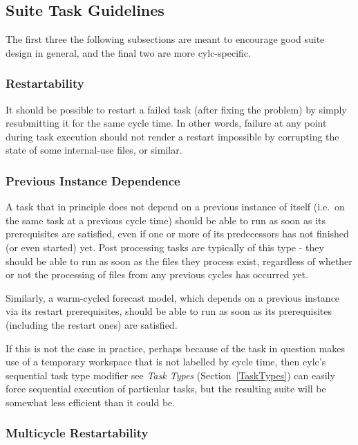 \documentclass[11pt,a4paper]{article}
\begin{document}
\subsection{Suite Task Guidelines} 
\label{SuiteTaskGuidelines}

The first three the following subsections are meant to encourage good
suite design in general, and the final two are more cylc-specific.

\subsubsection{Restartability}

It should be possible to restart a failed task (after fixing the
problem) by simply resubmitting it for the same cycle time. In other
words, failure at any point during task execution should not render a
restart impossible by corrupting the state of some internal-use files,
or similar. 

\subsubsection{Previous Instance Dependence} 

A task that in principle does not depend on a previous instance of
itself (i.e.\ on the same task at a previous cycle time) should be able
to run as soon as its prerequisites are satisfied, even if one or more
of its predecessors has not finished (or even started) yet.  Post
processing tasks are typically of this type - they should be able to run
as soon as the files they process exist, regardless of whether or not
the processing of files from any previous cycles has occurred yet.

Similarly, a warm-cycled forecast model, which depends on a previous
instance via its restart prerequisites, should be able to run as soon as
its prerequisites (including the restart ones) are satisfied.

If this is not the case in practice, perhaps because of the task in
question makes use of a temporary workspace that is not labelled by
cycle time, then cylc's sequential task type modifier see {\em Task
Types} (Section~\ref{TaskTypes}) can easily force sequential execution
of particular tasks, but the resulting suite will be somewhat less
efficient than it could be.

\subsubsection{Multicycle Restartability} 
\end{document}

